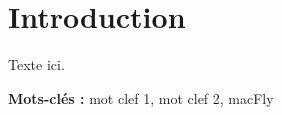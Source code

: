 \chapter{Introduction}

Texte ici. 

\vfill

\textbf{Mots-clés :} mot clef 1, mot clef 2, macFly

\vfill
